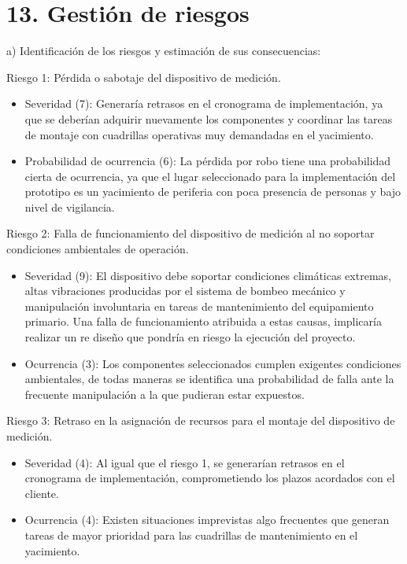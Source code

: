 \documentclass[
11pt, %
]{charter}
\begin{document}
\section{13. Gestión de riesgos}
\label{sec:riesgos}


a) Identificación de los riesgos y estimación de sus consecuencias:
 
Riesgo 1: Pérdida o sabotaje del dispositivo de medición.
\begin{itemize}
	\item Severidad (7): Generaría retrasos en el cronograma de implementación, ya que se deberían adquirir nuevamente los componentes y coordinar las tareas de montaje con cuadrillas operativas muy demandadas en el yacimiento.
	\item Probabilidad de ocurrencia (6): La pérdida por robo tiene una probabilidad cierta de ocurrencia, ya que el lugar seleccionado para la implementación del prototipo es un yacimiento de periferia con poca presencia de personas y bajo nivel de vigilancia.
\end{itemize}   

Riesgo 2: Falla de funcionamiento del dispositivo de medición al no soportar condiciones ambientales de operación.
\begin{itemize}
	\item Severidad (9): El dispositivo debe soportar condiciones climáticas extremas, altas vibraciones producidas por el sistema de bombeo mecánico y manipulación involuntaria en tareas de mantenimiento del equipamiento primario. Una falla de funcionamiento atribuida a estas causas, implicaría realizar un re diseño que pondría en riesgo la ejecución del proyecto. 
	\item Ocurrencia (3): Los componentes seleccionados cumplen exigentes condiciones ambientales, de todas maneras se identifica una probabilidad de falla ante la frecuente manipulación a la que pudieran estar expuestos.
\end{itemize}

Riesgo 3: Retraso en la asignación de recursos para el montaje del dispositivo de medición.
\begin{itemize}
	\item Severidad (4): Al igual que el riesgo 1, se generarían retrasos en el cronograma de implementación, comprometiendo los plazos acordados con el cliente.
	\item Ocurrencia (4): Existen situaciones imprevistas algo frecuentes que generan tareas de mayor prioridad para las cuadrillas de mantenimiento en el yacimiento.
\end{itemize}
\end{document}
